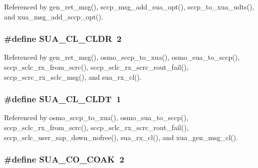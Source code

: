 Referenced by gen\+\_\+ret\+\_\+msg(), sccp\+\_\+msg\+\_\+add\+\_\+sua\+\_\+opt(), sccp\+\_\+to\+\_\+xua\+\_\+udts(), and xua\+\_\+msg\+\_\+add\+\_\+sccp\+\_\+opt().

\subsubsection[{S\+U\+A\+\_\+\+C\+L\+\_\+\+C\+L\+DR}]{\setlength{\rightskip}{0pt plus 5cm}\#define S\+U\+A\+\_\+\+C\+L\+\_\+\+C\+L\+DR~2}\label{sua_8h_a316409c445a6357df7f79bfb264a92e6}


Referenced by gen\+\_\+ret\+\_\+msg(), osmo\+\_\+sccp\+\_\+to\+\_\+xua(), osmo\+\_\+sua\+\_\+to\+\_\+sccp(), sccp\+\_\+sclc\+\_\+rx\+\_\+from\+\_\+scrc(), sccp\+\_\+sclc\+\_\+rx\+\_\+scrc\+\_\+rout\+\_\+fail(), sccp\+\_\+scrc\+\_\+rx\+\_\+sclc\+\_\+msg(), and sua\+\_\+rx\+\_\+cl().

\subsubsection[{S\+U\+A\+\_\+\+C\+L\+\_\+\+C\+L\+DT}]{\setlength{\rightskip}{0pt plus 5cm}\#define S\+U\+A\+\_\+\+C\+L\+\_\+\+C\+L\+DT~1}\label{sua_8h_a6363cbbe0da13b5c5d971e4e0e6c19bb}


Referenced by osmo\+\_\+sccp\+\_\+to\+\_\+xua(), osmo\+\_\+sua\+\_\+to\+\_\+sccp(), sccp\+\_\+sclc\+\_\+rx\+\_\+from\+\_\+scrc(), sccp\+\_\+sclc\+\_\+rx\+\_\+scrc\+\_\+rout\+\_\+fail(), sccp\+\_\+sclc\+\_\+user\+\_\+sap\+\_\+down\+\_\+nofree(), sua\+\_\+rx\+\_\+cl(), and xua\+\_\+gen\+\_\+msg\+\_\+cl().

\subsubsection[{S\+U\+A\+\_\+\+C\+O\+\_\+\+C\+O\+AK}]{\setlength{\rightskip}{0pt plus 5cm}\#define S\+U\+A\+\_\+\+C\+O\+\_\+\+C\+O\+AK~2}\label{sua_8h_afeb5ff3445caeea603847333e27544fa}


